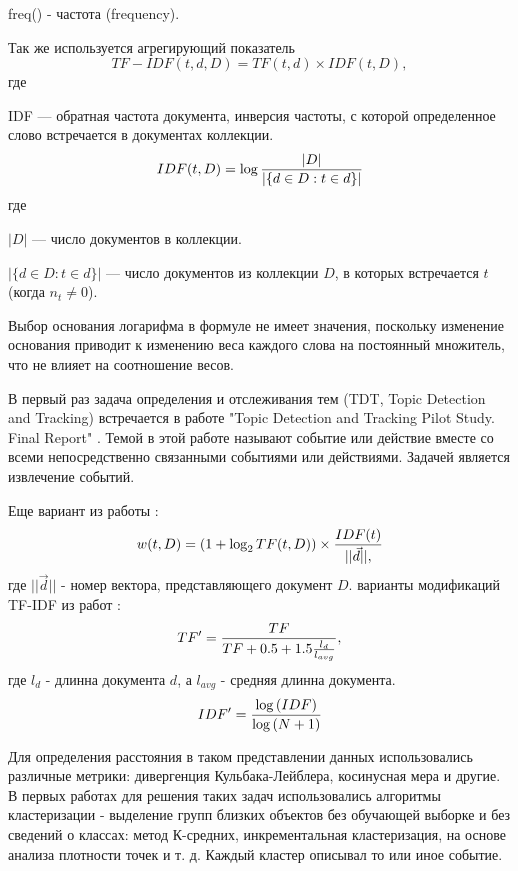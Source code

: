 freq() - частота (frequency).

Так же используется агрегирующий показатель
\begin{equation}
TF-IDF(t,d,D)=TF(t,d) \times IDF(t,D),
\end{equation}
где

IDF — обратная частота документа, инверсия частоты, с которой определенное слово встречается в документах коллекции.
\begin{equation}
IDF(t,D)=\log{{|D|}\over{|\{ d \in D:t \in d \}|}}
\end{equation}
где

$|D|$ — число документов в коллекции.

$|\{ d \in D:t \in d \}|$ — число документов из коллекции  $D$, в которых встречается  $t$ (когда $n_t \neq 0$).

Выбор основания логарифма в формуле не имеет значения, поскольку изменение основания приводит к изменению веса каждого слова на постоянный множитель, что не влияет на соотношение весов.


В первый раз задача определения и отслеживания тем (TDT, Topic Detection and Tracking) встречается в работе 
"Topic Detection and Tracking Pilot Study. Final Report" \cite{JamesAllan}. Темой в этой работе называют событие или действие вместе со всеми непосредственно связанными событиями или действиями. Задачей является извлечение событий.

Еще вариант из работы \cite{JamesAllan}:
\begin{equation}
w(t,D)=(1+\log_2{TF(t,D)}) \times {{IDF(t)}\over{||\vec{d}||},}
\end{equation}
где $||\vec{d}||$ - номер вектора, представляющего документ $D$.
 варианты модификаций TF-IDF из работ \cite{Allan}:
\begin{equation}
TF'={{TF}\over{TF+0.5+1.5{{l_d}\over{l_{avg}}}}},
\end{equation}
где $l_d$ - длинна документа $d$, а $l_{avg}$ - средняя длинна документа.
\begin{equation}
IDF'={{\log{(IDF)}}\over{\log{(N+1)}}}
\end{equation}

Для определения расстояния в таком представлении данных использовались различные метрики: дивергенция Кульбака-Лейблера, косинусная мера и другие. В первых работах для решения таких задач использовались алгоритмы кластеризации - выделение групп близких объектов без обучающей выборке и без сведений о классах: метод К-средних, инкрементальная кластеризация, на основе анализа плотности точек \cite{Klyshinskiy1} и т. д.  Каждый кластер описывал то или иное событие.


